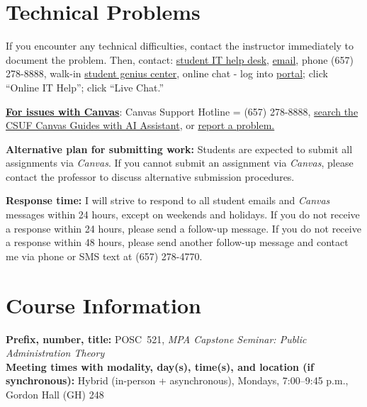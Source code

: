 \documentclass[11pt]{article}     %
\newcommand{\CourseCode}{POSC\ 521}
\newcommand{\CourseTitle}{MPA Capstone Seminar: Public Administration Theory}
\begin{document}
\section*{Technical Problems}
If you encounter any technical difficulties, contact the instructor immediately to document the problem. Then, contact: \href{http://www.fullerton.edu/it/students/helpdesk/index.php}{student IT help desk}, \href{mailto:StudentITHelpDesk@fullerton.edu}{email}, phone (657) 278-8888, walk-in \href{http://www.fullerton.edu/it/students/sgc/index.php}{student genius center}, online chat - log into \href{http://my.fullerton.edu}{portal}; click ``Online IT Help''; click ``Live Chat.''

\vspace{0.5em}
\noindent \textbf{\underline{For issues with Canvas}}: Canvas Support Hotline = (657) 278-8888, \href{https://canvashelp.fullerton.edu/}{search the CSUF Canvas Guides with AI Assistant}, or \href{https://titans.service-now.com/sp?id=sc_cat_item&sys_id=f88efe80ebea6a10fb7cfcffcad0cdc6&subject=Canvas}{report a problem.}

\vspace{0.5em}
\noindent \textbf{Alternative plan for submitting work:} Students are expected to submit all assignments via \emph{Canvas}. If you cannot submit an assignment via \emph{Canvas}, please contact the professor to discuss alternative submission procedures.

\vspace{0.5em}
\noindent \textbf{Response time:} I will strive to respond to all student emails and \emph{Canvas} messages within 24 hours, except on weekends and holidays. If you do not receive a response within 24 hours, please send a follow-up message. If you do not receive a response within 48 hours, please send another follow-up message and contact me via phone or SMS text at (657) 278-4770.

\section*{Course Information}
\noindent \textbf{Prefix, number, title:} \CourseCode, \textit{\CourseTitle} \\
\noindent \textbf{Meeting times with modality, day(s), time(s), and location (if synchronous):} Hybrid (in-person + asynchronous), Mondays, 7:00--9:45 p.m., Gordon Hall (GH) 248
\end{document}
